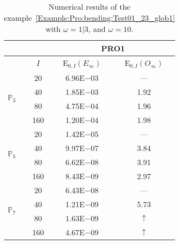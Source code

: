 \begin{table}[H]
\caption{Numerical results of the example~\ref{Example:Pro:bending:Test01_23_glob1} with $\omega=1|3$, and $\omega=10$.}
\setlength{\tabcolsep}{5pt}
\centering
\begin{tabular}{@{}l c c c@{}}
\toprule
 &  & \multicolumn{2}{c}{PRO1}\\
\midrule
 & $I$ & E$_{0,I}(E_{\infty})$ & E$_{0,I}(O_{\infty})$\\
\midrule
\multirow{4}{*}{$\mathbb{P}_{3}$} & 20 & 6.96E$-$03 & ---\\
 & 40 & 1.85E$-$03 & 1.92\\
 & 80 & 4.75E$-$04 & 1.96\\
 & 160 & 1.20E$-$04 & 1.98\\
\midrule
\multirow{4}{*}{$\mathbb{P}_{5}$} & 20 & 1.42E$-$05 & ---\\
 & 40 & 9.97E$-$07 & 3.84\\
 & 80 & 6.62E$-$08 & 3.91\\
 & 160 & 8.43E$-$09 & 2.97\\
\midrule
\multirow{4}{*}{$\mathbb{P}_{7}$} & 20 & 6.43E$-$08 & ---\\
 & 40 & 1.21E$-$09 & 5.73\\
 & 80 & 1.63E$-$09 & $\uparrow$\\
 & 160 & 4.67E$-$09 & $\uparrow$\\
\bottomrule
\end{tabular}
\label{Table:PRO:test_01_23_test20}
\end{table}
